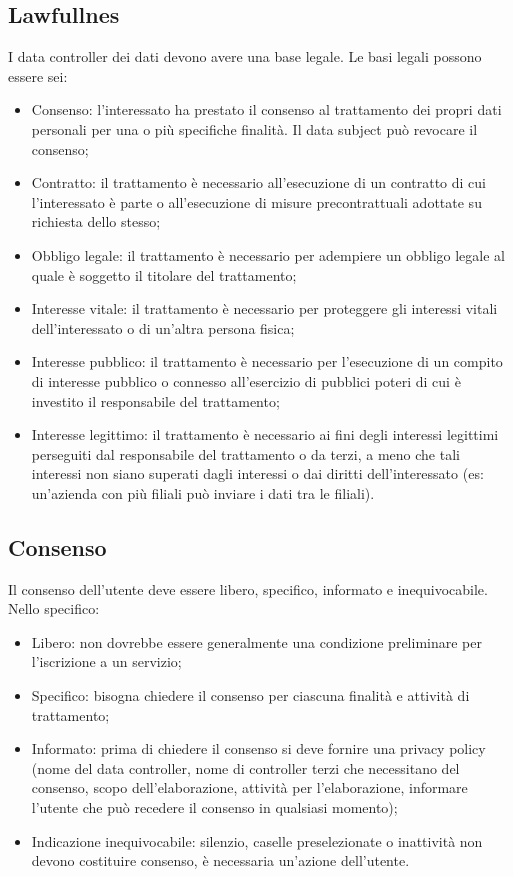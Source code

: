 \subsection{Lawfullnes}
I data controller dei dati devono avere una base legale. Le basi legali possono essere sei:
\begin{itemize}
    \item Consenso: l'interessato ha prestato il consenso al trattamento dei propri dati personali per una o più specifiche finalità. Il data subject può revocare il consenso;
    \item Contratto: il trattamento è necessario all'esecuzione di un contratto di cui l'interessato è parte o all'esecuzione di misure precontrattuali adottate su richiesta dello stesso;
    \item Obbligo legale: il trattamento è necessario per adempiere un obbligo legale al quale è soggetto il titolare del trattamento;
    \item Interesse vitale: il trattamento è necessario per proteggere gli interessi vitali dell'interessato o di un'altra persona fisica;
    \item Interesse pubblico: il trattamento è necessario per l'esecuzione di un compito di interesse pubblico o connesso all'esercizio di pubblici poteri di cui è investito il responsabile del trattamento;
    \item Interesse legittimo: il trattamento è necessario ai fini degli interessi legittimi perseguiti dal responsabile del trattamento o da terzi, a meno che tali interessi non siano superati dagli interessi o dai diritti dell'interessato (es: un'azienda con più filiali può inviare i dati tra le filiali).
\end{itemize}

\subsection{Consenso}
Il consenso dell'utente deve essere libero, specifico, informato e inequivocabile. Nello specifico:
\begin{itemize}
    \item Libero: non dovrebbe essere generalmente una condizione preliminare per l'iscrizione a un servizio;
    \item Specifico: bisogna chiedere il consenso per ciascuna finalità e attività di trattamento;
    \item Informato: prima di chiedere il consenso si deve fornire una privacy policy (nome del data controller, nome di controller terzi che necessitano del consenso, scopo dell'elaborazione, attività per l'elaborazione, informare l'utente che può recedere il consenso in qualsiasi momento);
    \item Indicazione inequivocabile: silenzio, caselle preselezionate o inattività non devono costituire consenso, è necessaria un'azione dell'utente.
\end{itemize}

